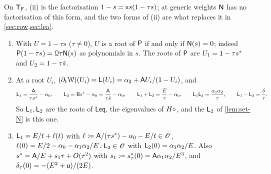 On $\mathsf{T}_{\mathrm{F}}$, (ii) is the factorisation $1-s=\mathsf{x} s(1-\tau s)$; at generic weights $\mathsf{N}$ has no factorisation of this form, and the two forms of (ii) are what replaces it in \cref{sec:row,sec:lea}.

\begin{lem}
\label{lem:set-eig}
\begin{enumerate}
\item With $U=1-\tau s$ ($\tau\neq0$), $U$ is a root of $\mathsf{P}$ if and only if $\mathsf{N}(s)=0$; indeed $\mathsf{P}(1-\tau s)=\mathcal{Q}\tau\mathsf{N}(s)$ as polynomials in $s$. The roots of $\mathsf{P}$ are $U_1=1-\tau s^{\ast}$ and $U_2=1-\tau\tilde{s}$.
\item At a root $U_i$, $(\partial_t\mathcal{W})(U_i)=\mathsf{L}(U_i)=\alpha_2+\mathsf{A} U_i/(1-U_i)$, and
\[
\mathsf{L}_1=\frac{\mathsf{A}}{\tau s^{\ast}}-\alpha_0,\qquad \mathsf{L}_2=\mathsf{B}s^{\ast}-\alpha_0=\frac{\mathsf{A}}{\tau\tilde{s}}-\alpha_0,\qquad
\mathsf{L}_1+\mathsf{L}_2=\frac E\tau-\alpha_0,\qquad \mathsf{L}_1\mathsf{L}_2=\frac{\alpha_1\alpha_2}{\tau},\qquad \mathsf{L}_1-\mathsf{L}_2=\frac\delta\tau .
\]
So $\mathsf{L}_1,\mathsf{L}_2$ are the roots of $\mathsf{Leq}$, the eigenvalues of $H\circ$, and the $\mathsf{L}_2$ of \cref{lem:set-N} is this one.
\item $\mathsf{L}_1=E/t+\ell(t)$ with $\ell\coloneqq\mathsf{A}/(\tau s^{\ast})-\alpha_0-E/t\in\mathscr{O}$, $\ell(0)=E/2-\alpha_0-\alpha_1\alpha_2/E$. $\mathsf{L}_2\in\mathscr{O}$ with $\mathsf{L}_2(0)=\alpha_1\alpha_2/E$. Also $s^{\ast}=\mathsf{A}/E+s_1\tau+O(\tau^2)$ with $s_1\coloneqq s^{\ast}_\tau(0)=\mathsf{A}\alpha_1\alpha_2/E^3$, and $\delta_\tau(0)=-(E^2+\mathsf{u})/(2E)$.
\end{enumerate}
\end{lem}

